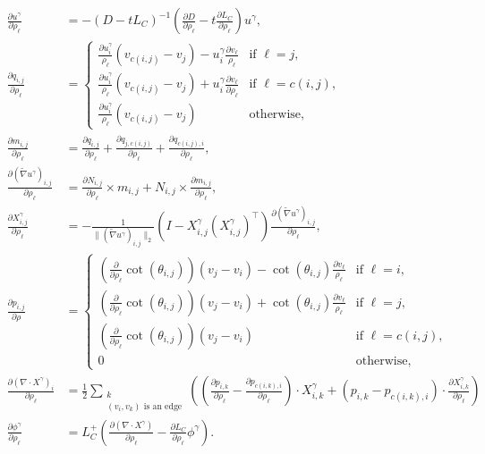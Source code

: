 $$\begin{aligned}
	\frac{\partial u^\gamma}{\partial \rho_\ell} &= -(D - tL_C)^{-1}\left(\frac{\partial D}{\partial \rho_\ell} - t\frac{\partial L_C}{\partial \rho_\ell}\right)u^\gamma, \\
	\frac{\partial q_{i, j}}{\partial \rho_\ell} &= \begin{cases}
		\displaystyle\frac{\partial u^\gamma_i}{\rho_\ell}(v_{c(i, j)} - v_j) - u^\gamma_i\frac{\partial v_\ell}{\rho_\ell} & \text{if $\ell = j$}, \\
		\displaystyle\frac{\partial u^\gamma_i}{\rho_\ell}(v_{c(i, j)} - v_j) + u^\gamma_i\frac{\partial v_\ell}{\partial \rho_\ell} & \text{if $\ell = c(i, j)$}, \\
		\displaystyle\frac{\partial u^\gamma_i}{\rho_\ell}(v_{c(i, j)} - v_j) & \text{otherwise},
	\end{cases} \\
	\frac{\partial m_{i, j}}{\partial \rho_\ell} &= \frac{\partial q_{i, j}}{\partial \rho_\ell} + \frac{\partial q_{j, c(i, j)}}{\partial \rho_\ell} + \frac{\partial q_{c(i, j), i}}{\partial \rho_\ell}, \\
	\frac{\partial (\widetilde{\nabla} u^\gamma)_{i, j}}{\partial \rho_\ell} &= \frac{\partial N_{i, j}}{\partial \rho_\ell} \times m_{i, j} + N_{i, j} \times \frac{\partial m_{i, j}}{\partial \rho_\ell}, \\
	\frac{\partial X^\gamma_{i, j}}{\partial \rho_\ell} &= -\frac{1}{\|(\widetilde{\nabla} u^\gamma)_{i, j}\|_2}(I - X^\gamma_{i, j}(X^\gamma_{i, j})^\intercal)\frac{\partial (\widetilde{\nabla} u^\gamma)_{i, j}}{\partial \rho_\ell}, \\
	\frac{\partial p_{i, j}}{\partial \rho} &= \begin{cases}
		\displaystyle\left(\frac{\partial}{\partial \rho_\ell}\cot(\theta_{i, j})\right)(v_j - v_i) - \cot(\theta_{i, j})\frac{\partial v_\ell}{\rho_\ell} & \text{if $\ell = i$}, \\
		\displaystyle\left(\frac{\partial}{\partial \rho_\ell}\cot(\theta_{i, j})\right)(v_j - v_i) + \cot(\theta_{i, j})\frac{\partial v_\ell}{\rho_\ell} & \text{if $\ell = j$}, \\
		\displaystyle\left(\frac{\partial}{\partial \rho_\ell}\cot(\theta_{i, j})\right)(v_j - v_i) & \text{if $\ell = c(i, j)$}, \\
		0 & \text{otherwise},
	\end{cases} \\
	\frac{\partial (\nabla \cdot X^\gamma)_i}{\partial \rho_\ell} &= \frac{1}{2}\sum_{\substack{k \\ \text{$(v_i, v_k)$ is an edge}}}\left(\left(\frac{\partial p_{i, k}}{\partial \rho_\ell} - \frac{\partial p_{c(i, k), i}}{\partial \rho_\ell}\right) \cdot X^\gamma_{i, k} + (p_{i, k} - p_{c(i, k), i}) \cdot \frac{\partial X^\gamma_{i, k}}{\partial \rho_\ell}\right) \\
	\frac{\partial \phi^\gamma}{\partial \rho_\ell} &= L_C^+\left(\frac{\partial (\nabla \cdot X^\gamma)}{\partial \rho_\ell} - \frac{\partial L_C}{\partial \rho_\ell}\phi^\gamma\right).
\end{aligned}$$
